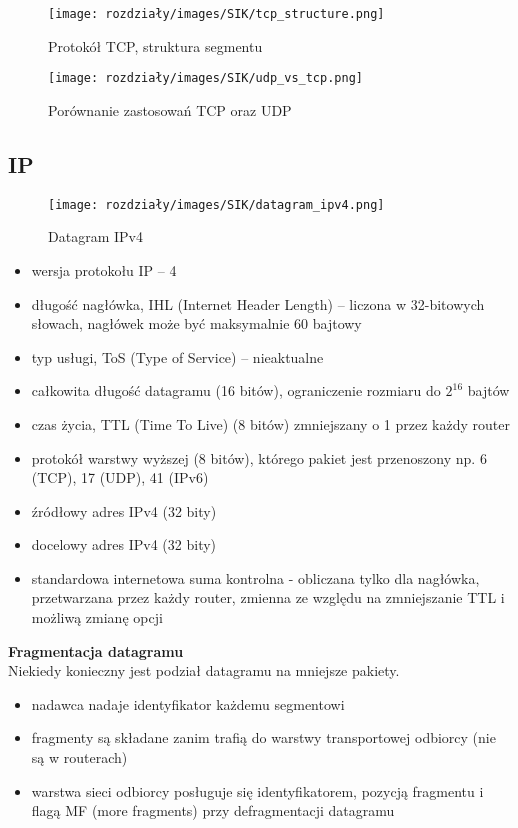 \begin{figure}[H]
    \centering
    \texttt{[image: rozdziały/images/SIK/tcp\_structure.png]}
    \caption{Protokół TCP, struktura segmentu}
\end{figure}

\begin{figure}[H]
    \centering
    \texttt{[image: rozdziały/images/SIK/udp\_vs\_tcp.png]}
    \caption{Porównanie zastosowań TCP oraz UDP}
\end{figure}


\subsection{IP}

\begin{figure}[H]
    \centering
    \texttt{[image: rozdziały/images/SIK/datagram\_ipv4.png]}
    \caption{Datagram IPv4}
\end{figure}

\begin{itemize}
    \item wersja protokołu IP – 4
    \item długość nagłówka, IHL (Internet Header Length) – liczona w 32-bitowych słowach,
    nagłówek może być maksymalnie 60 bajtowy
    \item typ usługi, ToS (Type of Service) – nieaktualne
    \item całkowita długość datagramu (16 bitów), ograniczenie rozmiaru do $2^{16}$ bajtów
    \item czas życia, TTL (Time To Live) (8 bitów) zmniejszany o 1 przez każdy router
    \item protokół warstwy wyższej (8 bitów), którego pakiet jest przenoszony np. 6 (TCP), 17 (UDP), 41 (IPv6)
    \item źródłowy adres IPv4 (32 bity)
    \item docelowy adres IPv4 (32 bity)
    \item standardowa internetowa suma kontrolna - obliczana tylko dla nagłówka, przetwarzana przez każdy router, zmienna ze względu na zmniejszanie TTL i możliwą zmianę opcji
\end{itemize}

\textbf{Fragmentacja datagramu} \\
Niekiedy konieczny jest podział datagramu na mniejsze pakiety.
\begin{itemize}
    \item nadawca nadaje identyfikator każdemu segmentowi
    \item fragmenty są składane zanim trafią do warstwy transportowej odbiorcy (nie są w routerach)
    \item warstwa sieci odbiorcy posługuje się identyfikatorem, pozycją fragmentu i flagą MF (more fragments) przy defragmentacji datagramu
\end{itemize}


